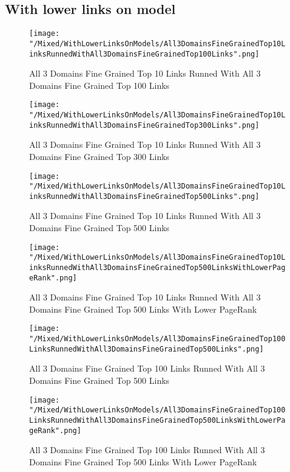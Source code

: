 \documentclass[thesis=M,english]{FITthesis}[2018/05/30]
\begin{document}
\subsection{With lower links on model}	
	\begin{figure}\centering
		\texttt{[image: "/Mixed/WithLowerLinksOnModels/All3DomainsFineGrainedTop10LinksRunnedWithAll3DomainsFineGrainedTop100Links".png]}
		\caption{All 3 Domains Fine Grained Top 10 Links Runned With All 3 Domains Fine Grained Top 100 Links}\label{}
	\end{figure}
	
	\begin{figure}\centering
		\texttt{[image: "/Mixed/WithLowerLinksOnModels/All3DomainsFineGrainedTop10LinksRunnedWithAll3DomainsFineGrainedTop300Links".png]}
		\caption{All 3 Domains Fine Grained Top 10 Links Runned With All 3 Domains Fine Grained Top 300 Links}\label{}
	\end{figure}
	
	\begin{figure}\centering
		\texttt{[image: "/Mixed/WithLowerLinksOnModels/All3DomainsFineGrainedTop10LinksRunnedWithAll3DomainsFineGrainedTop500Links".png]}
		\caption{All 3 Domains Fine Grained Top 10 Links Runned With All 3 Domains Fine Grained Top 500 Links}\label{}
	\end{figure}
	
	\begin{figure}\centering
		\texttt{[image: "/Mixed/WithLowerLinksOnModels/All3DomainsFineGrainedTop10LinksRunnedWithAll3DomainsFineGrainedTop500LinksWithLowerPageRank".png]}
		\caption{All 3 Domains Fine Grained Top 10 Links Runned With All 3 Domains Fine Grained Top 500 Links With Lower PageRank}\label{}
	\end{figure}
	
	\begin{figure}\centering
		\texttt{[image: "/Mixed/WithLowerLinksOnModels/All3DomainsFineGrainedTop100LinksRunnedWithAll3DomainsFineGrainedTop500Links".png]}
		\caption{All 3 Domains Fine Grained Top 100 Links Runned With All 3 Domains Fine Grained Top 500 Links}\label{}
	\end{figure}
	
	\begin{figure}\centering
		\texttt{[image: "/Mixed/WithLowerLinksOnModels/All3DomainsFineGrainedTop100LinksRunnedWithAll3DomainsFineGrainedTop500LinksWithLowerPageRank".png]}
		\caption{All 3 Domains Fine Grained Top 100 Links Runned With All 3 Domains Fine Grained Top 500 Links With Lower PageRank}\label{}
	\end{figure}
	
\end{document}
